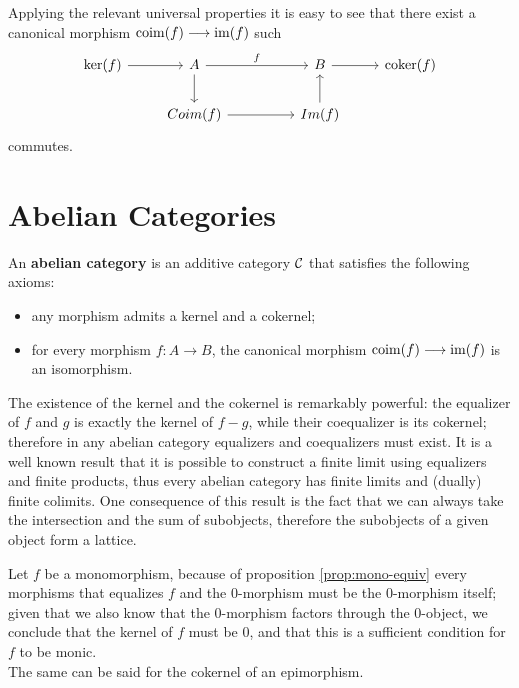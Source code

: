 Applying the relevant universal properties it is easy to see that there exist a canonical morphism $\operatorname{coim}(f) \longrightarrow \operatorname{im}(f)$ such 
\[\begin{tikzcd}
	{\ker(f)} & A && B & {\coker(f)} \\
	& {Coim(f)} && {Im(f)}
	\arrow[from=1-1, to=1-2]
	\arrow["f", from=1-2, to=1-4]
	\arrow[from=1-2, to=2-2]
	\arrow[from=1-4, to=1-5]
	\arrow[from=2-2, to=2-4]
	\arrow[from=2-4, to=1-4]
\end{tikzcd}\]
commutes.





\section{Abelian Categories}

\begin{definition}
	An \textbf{abelian category} is an additive category $\mathcal{C}$ that satisfies the following axioms:
	\begin{itemize}
  		\item[(AB1)] any morphism admits a kernel and a cokernel;
    	\item[(AB2)] for every morphism $f:A\longrightarrow B$, the canonical morphism $\operatorname{coim}(f) \longrightarrow \operatorname{im}(f)$ is an isomorphism.
	\end{itemize}
\end{definition}

The existence of the kernel and the cokernel is remarkably powerful: the equalizer of $f$ and $g$ is exactly the kernel of $f-g$, while their coequalizer is its cokernel; therefore in any abelian category equalizers and coequalizers must exist. It is a well known result that it is possible to construct a finite limit using equalizers and finite products, thus every abelian category has finite limits and (dually) finite colimits. One consequence of this result is the fact that we can always take the intersection and the sum of subobjects, therefore the subobjects of a given object form a lattice.


\begin{remark}
	Let $f$ be a monomorphism, because of proposition \ref{prop:mono-equiv} every morphisms that equalizes $f$ and the $0$-morphism must be the $0$-morphism itself; given that we also know that the $0$-morphism factors through the $0$-object, we conclude that the kernel of $f$ must be $0$, and that this is a sufficient condition for $f$ to be monic.\\
	The same can be said for the cokernel of an epimorphism. 
\end{remark}


